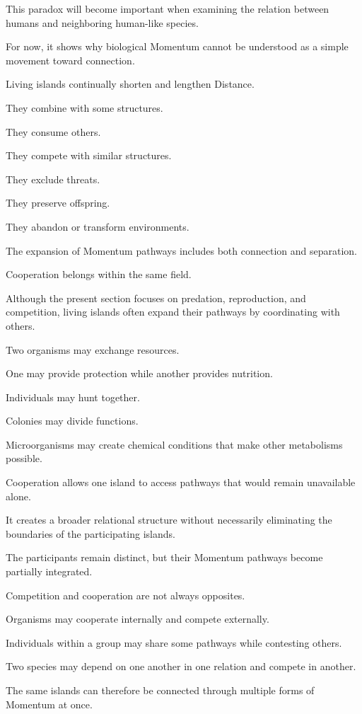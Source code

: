 This paradox will become important when examining the relation between humans and neighboring human-like species.

For now, it shows why biological Momentum cannot be understood as a simple movement toward connection.

Living islands continually shorten and lengthen Distance.

They combine with some structures.

They consume others.

They compete with similar structures.

They exclude threats.

They preserve offspring.

They abandon or transform environments.

The expansion of Momentum pathways includes both connection and separation.

Cooperation belongs within the same field.

Although the present section focuses on predation, reproduction, and competition, living islands often expand their pathways by coordinating with others.

Two organisms may exchange resources.

One may provide protection while another provides nutrition.

Individuals may hunt together.

Colonies may divide functions.

Microorganisms may create chemical conditions that make other metabolisms possible.

Cooperation allows one island to access pathways that would remain unavailable alone.

It creates a broader relational structure without necessarily eliminating the boundaries of the participating islands.

The participants remain distinct, but their Momentum pathways become partially integrated.

Competition and cooperation are not always opposites.

Organisms may cooperate internally and compete externally.

Individuals within a group may share some pathways while contesting others.

Two species may depend on one another in one relation and compete in another.

The same islands can therefore be connected through multiple forms of Momentum at once.

